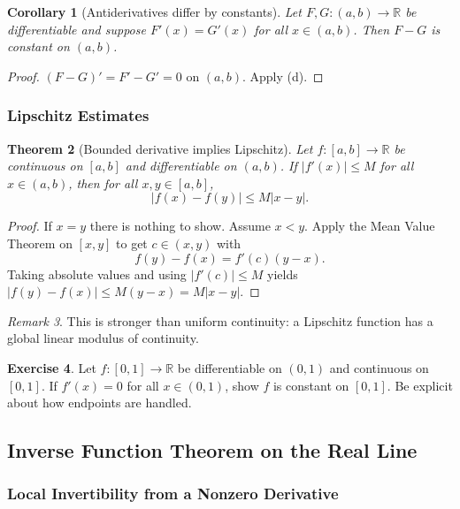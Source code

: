 \documentclass[12pt]{article}
\numberwithin{equation}{section}
\def\abs#1{|#1|}
\newcommand{\RR}{\mathbb{R}}
\DeclarePairedDelimiter{\abs}{\lvert}{\rvert}
\theoremstyle{plain}
\newtheorem{theorem}{Theorem}[section]
\newtheorem{corollary}[theorem]{Corollary}
\theoremstyle{definition}
\newtheorem{exercise}[theorem]{Exercise}
\theoremstyle{remark}
\newtheorem{remark}[theorem]{Remark}
\begin{document}
\begin{corollary}[Antiderivatives differ by constants]\label{cor:antideriv-const}
Let $F,G:(a,b)\to\RR$ be differentiable and suppose $F'(x)=G'(x)$ for all $x\in(a,b)$.
Then $F-G$ is constant on $(a,b)$.
\end{corollary}

\begin{proof}
$(F-G)'=F'-G'=0$ on $(a,b)$. Apply (d).
\end{proof}

\subsubsection{Lipschitz Estimates}

\begin{theorem}[Bounded derivative implies Lipschitz]\label{thm:lipschitz}
Let $f:[a,b]\to\RR$ be continuous on $[a,b]$ and differentiable on $(a,b)$.
If $\abs{f'(x)}\le M$ for all $x\in(a,b)$, then for all $x,y\in[a,b]$,
\[
\abs{f(x)-f(y)}\le M\abs{x-y}.
\]
\end{theorem}

\begin{proof}
If $x=y$ there is nothing to show. Assume $x<y$.
Apply the Mean Value Theorem on $[x,y]$ to get $c\in(x,y)$ with
\[
f(y)-f(x)=f'(c)(y-x).
\]
Taking absolute values and using $\abs{f'(c)}\le M$ yields $\abs{f(y)-f(x)}\le M(y-x)=M\abs{x-y}$.
\end{proof}

\begin{remark}
This is stronger than uniform continuity: a Lipschitz function has a global linear modulus of continuity.
\end{remark}

\begin{exercise}
Let $f:[0,1]\to\RR$ be differentiable on $(0,1)$ and continuous on $[0,1]$.
If $f'(x)=0$ for all $x\in(0,1)$, show $f$ is constant on $[0,1]$.
Be explicit about how endpoints are handled.
\end{exercise}

\newpage

\subsection{Inverse Function Theorem on the Real Line}

\subsubsection{Local Invertibility from a Nonzero Derivative}
\end{document}
